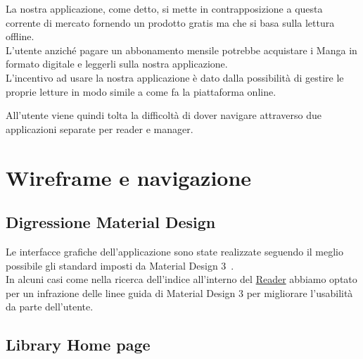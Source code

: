 \documentclass{report}
\begin{document}
La nostra applicazione, come detto, si mette in contrapposizione a
questa corrente di mercato fornendo un prodotto gratis ma che si basa
sulla lettura offline.\\
L'utente anziché pagare un abbonamento mensile potrebbe acquistare i
Manga in formato digitale e leggerli sulla nostra applicazione.\\
L'incentivo ad usare la nostra applicazione è dato dalla possibilità di
gestire le proprie letture in modo simile a come fa la piattaforma
online.

All'utente viene quindi tolta la difficoltà di dover navigare attraverso
due applicazioni separate per reader e manager.

\chapter{Wireframe e navigazione}

\section{Digressione Material Design}

Le interfacce grafiche dell'applicazione sono state realizzate seguendo il meglio possibile gli standard imposti da Material Design 3~\cite{matDes}.\\
In alcuni casi come nella ricerca dell'indice all'interno del \hyperref[sec:raeder]{Reader} abbiamo optato per un infrazione delle linee guida di Material Design 3 per migliorare l'usabilità da parte dell'utente.

\section{Library \- Home page}\label{sec:home}
\end{document}
